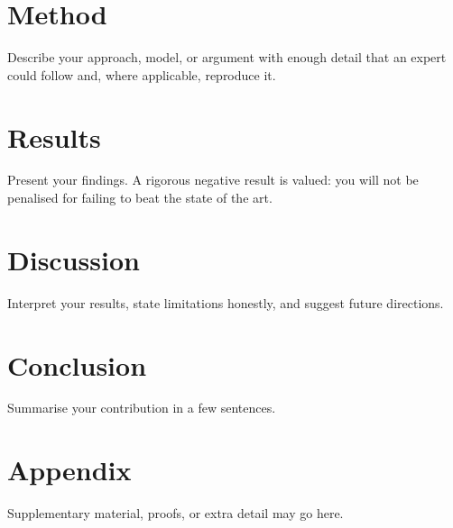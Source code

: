 \documentclass[11pt,a4paper]{article}
\begin{document}
\section{Method}
Describe your approach, model, or argument with enough detail
that an expert could follow and, where applicable, reproduce
it.

\section{Results}
Present your findings. A rigorous negative result is valued:
you will not be penalised for failing to beat the state of the
art.

\section{Discussion}
Interpret your results, state limitations honestly, and
suggest future directions.

\section{Conclusion}
Summarise your contribution in a few sentences.




\appendix
\section{Appendix}
Supplementary material, proofs, or extra detail may go here.
\end{document}

